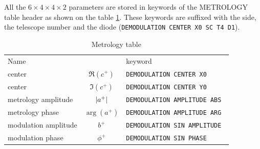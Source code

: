 \documentclass[a4paper,11pt,twoside]{scrartcl}
\begin{document}
All the $6\times4\times4\times2$ parameters are stored in keywords of the METROLOGY table header as shown on the table \ref{tab:keyword}. These keywords are suffixed with the side, the telescope number and the diode (\eg \verb|DEMODULATION CENTER X0 SC T4 D1|).
\begin{table}[]
    \centering
    \begin{tabular}{l c l}
Name   &          & keyword   \\
center    &      $\Re(c^+)$        &   \verb|DEMODULATION CENTER X0|   \\
center   &      $\Im(c^+) $       &   \verb|DEMODULATION CENTER Y0|   \\
metrology amplitude  &      $\left\vert a^+\right\vert $       &   \verb|DEMODULATION AMPLITUDE ABS|   \\
metrology phase  &      $\arg{(a^+)} $       &   \verb|DEMODULATION AMPLITUDE ARG|   \\
modulation amplitude  &      $b^+ $       &   \verb|DEMODULATION SIN AMPLITUDE |   \\
modulation phase  &      $\phi^+ $       &   \verb|DEMODULATION SIN PHASE|   
    \end{tabular}
    \caption{Metrology table}
    \label{tab:keyword}
\end{table}
\end{document}
